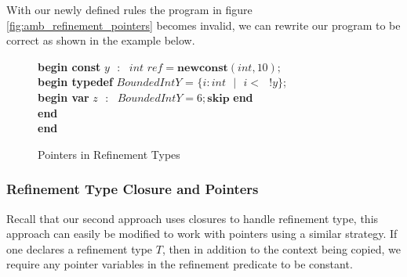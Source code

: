 \documentclass[a4paper,12pt]{report}
\newenvironment{tabs}[1]
 {\flushleft\TabPositions{#1}}
 {\endflushleft}
\begin{document}
With our newly defined rules the program in figure \ref{fig:amb_refinement_pointers} 
becomes invalid, we can rewrite our program to be correct as shown in the example below. 

\begin{figure} [H]
  \begin{tabs}{1cm,2cm}
    \textbf{begin const }$y\text{ }:\text{ } int\textit{ ref} = \textbf{newconst}(int, 10);$\\
    \tab\textbf{begin typedef }$BoundedIntY$ = $\{i : int\text{ }|\text{ }i <\text{ }!y\}$; \\ 
    \tab\tab\textbf{begin var }$z\text{ }:\text{ }BoundedIntY = 6;\textbf{skip}$\textbf { end} \\
    \tab\textbf {end} \\
    \textbf{end}
  \end{tabs}  
  \caption{Pointers in Refinement Types}
  \label{fig:valid_ptr_program}
\end{figure}


\subsubsection{Refinement Type Closure and Pointers}
Recall that our second approach uses closures to handle refinement type, 
this approach can easily be modified to work with pointers using a 
similar strategy. If one declares a refinement type $T$, then in addition to 
the context being copied, we require any pointer variables in the refinement 
predicate to be constant. 
\end{document}
